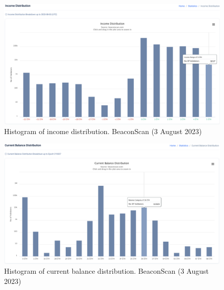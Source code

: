 \documentclass[UTF8]{article}
\begin{document}
{\begin{figure}[htbp]
\begin{center}
\includegraphics[width=\linewidth]{images/beaconscan14}
\caption{Histogram of income distribution. BeaconScan (3 August 2023)}
\label{fig:beaconscan14}
\end{center}
\end{figure}

\begin{figure}[htbp]
\begin{center}
\includegraphics[width=\linewidth]{images/beaconscan15}
\caption{Histogram of current balance distribution. BeaconScan (3 August 2023)}
\label{fig:beaconscan15}
\end{center}
\end{figure}

}
\end{document}
